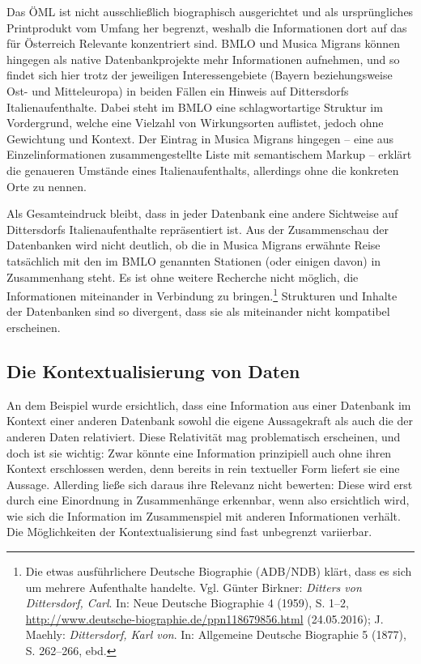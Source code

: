 \documentclass[a4paper,
fontsize=11pt,
oneside,
numbers=noperiodatend,
parskip=half-,
bibliography=totoc,
final
]{scrartcl}
\begin{document}
Das ÖML ist nicht ausschließlich biographisch ausgerichtet und als
ursprüngliches Printprodukt vom Umfang her begrenzt, weshalb die
Informationen dort auf das für Österreich Relevante konzentriert sind.
BMLO und Musica Migrans können hingegen als native Datenbankprojekte
mehr Informationen aufnehmen, und so findet sich hier trotz der
jeweiligen Interessengebiete (Bayern beziehungsweise Ost- und
Mitteleuropa) in beiden Fällen ein Hinweis auf Dittersdorfs
Italienaufenthalte. Dabei steht im BMLO eine schlagwortartige Struktur
im Vordergrund, welche eine Vielzahl von Wirkungsorten auflistet, jedoch
ohne Gewichtung und Kontext. Der Eintrag in Musica Migrans hingegen --
eine aus Einzelinformationen zusammengestellte Liste mit semantischem
Markup -- erklärt die genaueren Umstände eines Italienaufenthalts,
allerdings ohne die konkreten Orte zu nennen.

Als Gesamteindruck bleibt, dass in jeder Datenbank eine andere
Sichtweise auf Dittersdorfs Italienaufenthalte repräsentiert ist. Aus
der Zusammenschau der Datenbanken wird nicht deutlich, ob die in Musica
Migrans erwähnte Reise tatsächlich mit den im BMLO genannten Stationen
(oder einigen davon) in Zusammenhang steht. Es ist ohne weitere
Recherche nicht möglich, die Informationen miteinander in Verbindung zu
bringen.\footnote{Die etwas ausführlichere Deutsche Biographie (ADB/NDB)
  klärt, dass es sich um mehrere Aufenthalte handelte. Vgl. Günter
  Birkner: \emph{Ditters von Dittersdorf, Carl}. In: Neue Deutsche
  Biographie 4 (1959), S. 1--2,
  \url{http://www.deutsche-biographie.de/ppn118679856.html}
  (24.05.2016); J. Maehly: \emph{Dittersdorf, Karl von}. In: Allgemeine
  Deutsche Biographie 5 (1877), S. 262--266, ebd.} Strukturen und
Inhalte der Datenbanken sind so divergent, dass sie als miteinander
nicht kompatibel erscheinen.

\subsection*{Die Kontextualisierung von
Daten}\label{die-kontextualisierung-von-daten}

An dem Beispiel wurde ersichtlich, dass eine Information aus einer
Datenbank im Kontext einer anderen Datenbank sowohl die eigene
Aussagekraft als auch die der anderen Daten relativiert. Diese
Relativität mag problematisch erscheinen, und doch ist sie wichtig: Zwar
könnte eine Information prinzipiell auch ohne ihren Kontext erschlossen
werden, denn bereits in rein textueller Form liefert sie eine Aussage.
Allerding ließe sich daraus ihre Relevanz nicht bewerten: Diese wird
erst durch eine Einordnung in Zusammenhänge erkennbar, wenn also
ersichtlich wird, wie sich die Information im Zusammenspiel mit anderen
Informationen verhält. Die Möglichkeiten der Kontextualisierung sind
fast unbegrenzt variierbar.
\end{document}
